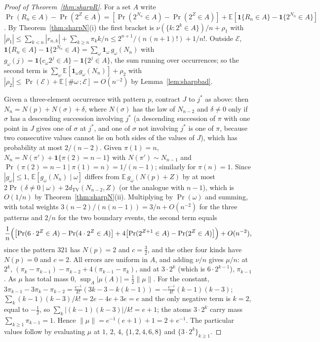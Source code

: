 \begin{proof}[Proof of Theorem~\ref{thm:sharpR}]
For a set $A$ write $\Pr(R_n\in A)-\Pr(2^Z\in A)=[\Pr(2^{N_n}\in A)-\Pr(2^Z\in A)]+\mathbb E[\mathbf 1\{R_n\in A\}-\mathbf 1\{2^{N_n}\in A\}]$. By Theorem~\ref{thm:sharpN}(i) the first bracket is $\nu(\{k:2^k\in A\})/n+\rho_1$ with $|\rho_1|\le\sum_{k<n}|r_{n,k}|+\sum_{k\ge n}\pi_kk/n\le2^{n+1}/(n\,(n+1)!)+1/n!$. Outside $\mathcal E$, $\mathbf 1\{R_n\in A\}-\mathbf 1\{2^{N_n}\in A\}=\sum_\omega\mathbf 1_\omega\,g_\omega(N_n)$ with $g_\omega(j)=\mathbf 1\{c_\omega2^j\in A\}-\mathbf 1\{2^j\in A\}$, the sum running over occurrences; so the second term is $\sum_\omega\mathbb E[\mathbf 1_\omega g_\omega(N_n)]+\rho_2$ with $|\rho_2|\le\Pr(\mathcal E)+\mathbb E[\#\omega\,;\mathcal E]=O(n^{-2})$ by Lemma~\ref{lem:sharpbad}.

Given a three-element occurrence with pattern $p$, contract $J$ to $j^*$ as above: then $N_n=N(p)+N(\sigma)+\delta$, where $N(\sigma)$ has the law of $N_{n-2}$ and $\delta\ne0$ only if $\sigma$ has a descending succession involving $j^*$ (a descending succession of $\pi$ with one point in $J$ gives one of $\sigma$ at $j^*$, and one of $\sigma$ not involving $j^*$ is one of $\pi$, because two consecutive values cannot lie on both sides of the values of $J$), which has probability at most $2/(n-2)$. Given $\pi(1)=n$, $N_n=N(\pi')+\mathbf 1\{\pi(2)=n-1\}$ with $N(\pi')\sim N_{n-1}$ and $\Pr(\pi(2)=n-1\mid\pi(1)=n)=1/(n-1)$; similarly for $\pi(n)=1$. Since $|g_\omega|\le1$, $\mathbb E[g_\omega(N_n)\mid\omega]$ differs from $\mathbb E\,g_\omega(N(p)+Z)$ by at most $2\Pr(\delta\ne0\mid\omega)+2d_{\mathrm{TV}}(N_{n-2},Z)$ (or the analogue with $n-1$), which is $O(1/n)$ by Theorem~\ref{thm:sharpN}(ii). Multiplying by $\Pr(\omega)$ and summing, with total weights $3(n-2)/(n(n-1))=3/n+O(n^{-2})$ for the three patterns and $2/n$ for the two boundary events, the second term equals
\[
\frac1n\Bigl(\bigl[\Pr(6\cdot2^Z\in A)-\Pr(4\cdot2^Z\in A)\bigr]+4\bigl[\Pr(2^{Z+1}\in A)-\Pr(2^Z\in A)\bigr]\Bigr)+O(n^{-2}),
\]
since the pattern $321$ has $N(p)=2$ and $c=\tfrac32$, and the other four kinds have $N(p)=0$ and $c=2$. All errors are uniform in $A$, and adding $\nu/n$ gives $\mu/n$: at $2^k$, $(\pi_k-\pi_{k-1})-\pi_{k-2}+4(\pi_{k-1}-\pi_k)$, and at $3\cdot2^k$ (which is $6\cdot2^{k-1}$), $\pi_{k-1}$. As $\mu$ has total mass $0$, $\sup_A|\mu(A)|=\tfrac12\lVert\mu\rVert$. For the constant, $3\pi_{k-1}-3\pi_k-\pi_{k-2}=\frac{e^{-1}}{k!}(3k-3-k(k-1))=-\frac{e^{-1}}{k!}(k-1)(k-3)$; $\sum_k(k-1)(k-3)/k!=2e-4e+3e=e$ and the only negative term is $k=2$, equal to $-\tfrac12$, so $\sum_k|(k-1)(k-3)|/k!=e+1$; the atoms $3\cdot2^k$ carry mass $\sum_{k\ge1}\pi_{k-1}=1$. Hence $\lVert\mu\rVert=e^{-1}(e+1)+1=2+e^{-1}$. The particular values follow by evaluating $\mu$ at $1$, $2$, $4$, $\{1,2,4,6,8\}$ and $\{3\cdot2^k\}_{k\ge1}$.
\end{proof}

